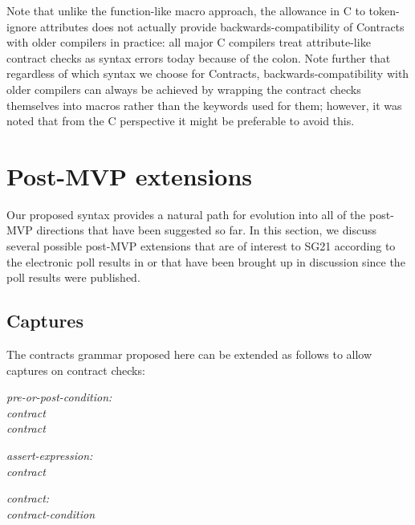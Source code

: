 Note that unlike the function-like macro approach, the allowance in C to token-ignore attributes does not actually provide backwards-compatibility of Contracts with older compilers in practice: all major C compilers treat attribute-like contract checks as syntax errors today because of the colon. Note further that regardless of which syntax we choose for Contracts, backwards-compatibility with older compilers can always be achieved by wrapping the contract checks themselves into macros rather than the keywords used for them; however, it was noted that from the C perspective it might be preferable to avoid this.



\section{Post-MVP extensions}

Our proposed syntax provides a natural path for evolution into all of the post-MVP directions that have been suggested so far. In this section, we discuss several possible post-MVP extensions that are of interest to SG21 according to the electronic poll results in \cite{P2885R3} or that have been brought up in discussion since the poll results were published.

\subsection{Captures}
\label{subsec:captures}

The contracts grammar proposed here can be extended as follows to allow captures on contract checks:

\begin{adjustwidth}{0.5cm}{0.5cm}

\emph{pre-or-post-condition:} \\
\phantom{~~~} \emph{contract} \\
\phantom{~~~} \emph{contract}

\emph{assert-expression:} \\
\phantom{~~~} \emph{contract}

\emph{contract:} \\
\phantom{~~~} \emph{contract-condition}

 \\
\phantom{~~~}

\end{adjustwidth}

